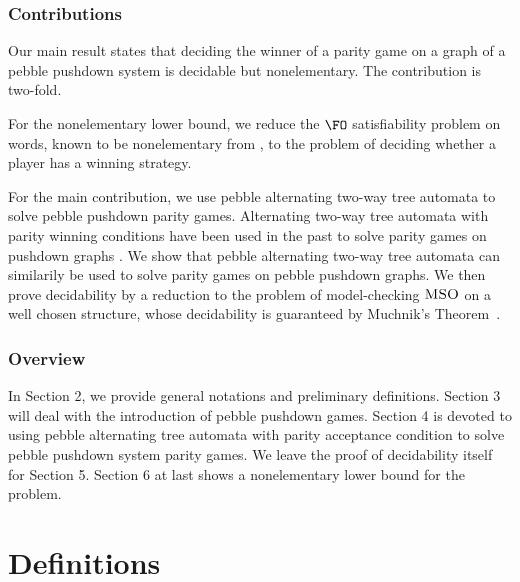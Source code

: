 \documentclass[a4paper,UKenglish,cleveref, autoref, thm-restate]{lipics-v2021}
\newcommand{\MSO}{\textsc{MSO}}
\begin{document}
\fi

\subsubsection*{Contributions}


Our main result states that
deciding
the winner of a parity game on a graph of a pebble pushdown system
is decidable but nonelementary.
The contribution is two-fold. 




	For the nonelementary lower bound,
we reduce the $\FO$ satisfiability problem on words, known to be nonelementary
from \cite{Sto74}, to the
problem of deciding whether a player has a winning strategy. 

	For the main contribution, we use pebble alternating two-way tree automata to solve pebble pushdown parity games.
Alternating two-way tree automata with parity winning conditions have been used in the past to solve parity games on pushdown graphs \cite{cachat2002two}. We show that pebble alternating two-way tree automata can similarily be used to solve parity games on pebble pushdown graphs.
We then prove  decidability 
by 
a reduction
 to the problem of model-checking $\MSO$ on a well chosen structure, whose decidability is
 guaranteed by
Muchnik's Theorem~\cite{Wal96}.



\subsubsection*{Overview}

In Section 2, we provide general notations and preliminary definitions. Section 3 will deal with the introduction of pebble pushdown games.
Section 4 is devoted to using pebble alternating tree automata with parity acceptance condition to solve pebble pushdown system parity games. We leave the proof of decidability itself  for Section 5.
Section 6 at last shows a nonelementary lower bound for the problem.




\section{Definitions}


\newcommand{\LCM}{\mathsf{LCM}}
\newcommand{\LOGSPACE}{\mathsf{LOGSPACE}}
\renewcommand{\MSO}{\mathsf{MSO}}
\newcommand{\SO}{\mathsf{SO}}
\end{document}

